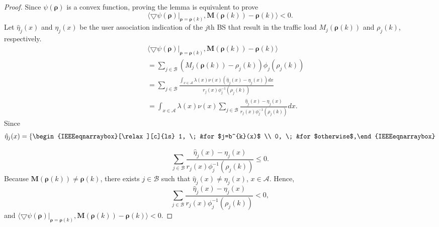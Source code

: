 \documentclass[journal]{IEEEtran}
\theoremstyle{definition}
\begin{document}
\begin{proof}
\label{prf:descent_direction}
Since $\psi(\boldsymbol{\rho})$ is a convex function, proving the lemma is equivalent to prove
\begin{equation}
\langle\bigtriangledown{\psi(\boldsymbol{\rho})}|_{\boldsymbol{\rho}=\boldsymbol{\rho}(k)},\boldsymbol{M}(\boldsymbol{\rho}(k))-\boldsymbol{\rho}(k)\rangle<0.
\end{equation}
Let $\hat{\eta}_{j}(x)$ and $\eta_{j}(x)$ be the user association indication of the $j$th BS that result in the traffic load $M_{j}(\boldsymbol{\rho}(k))$ and $\rho_{j}(k)$, respectively.
\begin{eqnarray}
\label{eq:prf_descent_direction}
&&\langle\bigtriangledown{\psi(\boldsymbol{\rho})}|_{\boldsymbol{\rho}=\boldsymbol{\rho}(k)},\boldsymbol{M}(\boldsymbol{\rho}(k))-\boldsymbol{\rho}(k)\rangle\\
&&=\sum_{j\in\mathcal{B}}(M_{j}(\boldsymbol{\rho}(k))-\rho_{j}(k))\phi_{j}(\rho_{j}(k)) \nonumber\\
&&=\sum_{j\in\mathcal{B}}\frac{\int_{x \in \mathcal{A}}\lambda(x)\nu(x)(\hat{\eta}_{j}(x)-\eta_{j}(x))dx}{r_{j}(x)\phi^{-1}_{j}(\rho_{j}(k))} \nonumber\\
&&=\int_{x \in \mathcal{A}}\lambda(x)\nu(x)\sum_{j\in\mathcal{B}}\frac{\hat{\eta}_{j}(x)-\eta_{j}(x)}{r_{j}(x)\phi^{-1}_{j}(\rho_{j}(k))}dx. \nonumber
\end{eqnarray}
Since
\begin{equation}
\label{eq:eta_m}
\setlength{\nulldelimiterspace}{0pt}
\hat{\eta}_{j}(x)=\left\{\begin{IEEEeqnarraybox}[\relax][c]{ls}
1,
\; &for $j=b^{k}(x)$  \\
0, \; &for $otherwise$,\end{IEEEeqnarraybox}\right.
\end{equation}

\begin{equation}
\label{eq:sum_leq_0}
\sum_{j\in\mathcal{B}}\frac{\hat{\eta}_{j}(x)-\eta_{j}(x)}{r_{j}(x)\phi^{-1}_{j}(\rho_{j}(k))}\leq 0.
\end{equation}
Because $\boldsymbol{M}(\boldsymbol{\rho}(k)) \neq \boldsymbol{\rho}(k)$, there exists $j\in \mathcal{B}$ such that $\hat{\eta}_{j}(x)\neq\eta_{j}(x)$, $ x \in \mathcal{A}$. Hence,
\begin{equation}
\label{eq:sum_less_0}
\sum_{j\in\mathcal{B}}\frac{\hat{\eta}_{j}(x)-\eta_{j}(x)}{r_{j}(x)\phi^{-1}_{j}(\rho_{j}(k))}<0,
\end{equation}
and $\langle\bigtriangledown{\psi(\boldsymbol{\rho})}|_{\boldsymbol{\rho}=\boldsymbol{\rho}(k)},\boldsymbol{M}(\boldsymbol{\rho}(k))-\boldsymbol{\rho}(k)\rangle<0$.
\end{proof}
\end{document}
